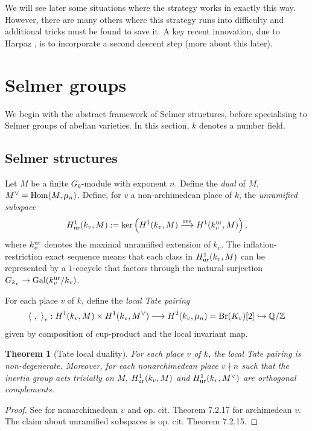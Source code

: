 \documentclass[10pt]{amsart}
\numberwithin{equation}{section}
\newtheorem{theorem}[equation]{Theorem}
\theoremstyle{remark}
\theoremstyle{definition}
\theoremstyle{definition}
\theoremstyle{definition}
\theoremstyle{definition}
\theoremstyle{definition}
\theoremstyle{definition}
\theoremstyle{definition}
\theoremstyle{definition}
\begin{document}
 We will see later some situations where the strategy works in exactly this way. However, there are many others where this strategy runs into difficulty and additional tricks must be found to save it. A key recent innovation, due to Harpaz \cite{Har19}, is to incorporate a second descent step (more about this later). 
 
 

\section{Selmer groups}

We begin with the abstract framework of Selmer structures, before specialising to Selmer groups of abelian varieties. In this section, $k$ denotes a number field.

\subsection{Selmer structures} Let $M$ be a finite $G_k$-module with exponent $n$.  Define the \textit{dual} of $M$, $M^\vee=\textup{Hom}(M, \mu_n)$. Define, for $v$ a non-archimedean place of $k$, the \textit{unramified subspace} 
\[H^1_{\textup{ur}}(k_v,M):=\ker\left(H^1(k_v,M)\stackrel{\textup{res}}{\longrightarrow}H^1(k_v^{\textup{ur}},M)\right),\]
where $k_v^{\textup{ur}}$ denotes the maximal unramified extension of $k_v$. The inflation-restriction exact sequence means that each class in $H^1_{\textup{ur}}(k_v,M)$ can be represented by a $1$-cocycle that factors through the natural surjection $G_{k_v}\to \textup{Gal}(k_v^{\textup{ur}}/k_v)$.
 

For each place $v$ of $k$, define the \textit{local Tate pairing}  
\[\left \langle~,~\right \rangle_v:H^1(k_v,M)\times H^1(k_v,M^\vee)\longrightarrow H^2(k_v,  \mu_n)=\textup{Br}(K_v)[2]\hookrightarrow \mathbb{Q}/\mathbb{Z}\] given by composition of cup-product and the local invariant map.

\begin{theorem}[Tate local duality]
For each place $v$ of $k$, the local Tate pairing  is non-degenerate. Moreover, for each nonarchimedean place $v\nmid n$ such that the inertia group  acts trivially on $M$, $H^1_{\textup{ur}}(k_v,M)$ and $H^1_{\textup{ur}}(k_v,M^\vee)$ are orthogonal complements.
\end{theorem}

\begin{proof}
See \cite[Corollary 7.2.6]{NSW08} for nonarchimedean $v$ and op. cit. Theorem 7.2.17 for archimedean $v$. The claim about  unramified subspaces is op. cit. Theorem 7.2.15.
\end{proof}
\end{document}
